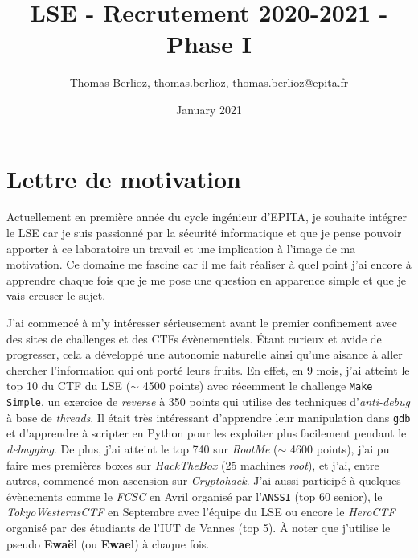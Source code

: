 \documentclass[a4paper, 11pt]{article}
\title{LSE - Recrutement 2020-2021 - Phase I}
\author{Thomas Berlioz, thomas.berlioz, thomas.berlioz@epita.fr}
\date{January 2021}
\begin{document}
\maketitle

\section*{Lettre de motivation}

    Actuellement en première année du cycle ingénieur d’EPITA, je souhaite intégrer le LSE car je suis passionné par la sécurité informatique et que je pense pouvoir apporter à ce laboratoire un travail et une implication à l’image de ma motivation. Ce domaine me fascine car il me fait réaliser à quel point j’ai encore à apprendre chaque fois que je me pose une question en apparence simple et que je vais creuser le sujet.

    J’ai commencé à m’y intéresser sérieusement avant le premier confinement avec des sites de challenges et des CTFs évènementiels. Étant curieux et avide de progresser, cela a développé une autonomie naturelle ainsi qu’une aisance à aller chercher l’information qui ont porté leurs fruits. En effet, en 9 mois, j’ai atteint le top 10 du CTF du LSE ($\sim$ 4500 points) avec récemment le challenge \texttt{Make Simple}, un exercice de \emph{reverse} à 350 points qui utilise des techniques d’\emph{anti-debug} à base de \emph{threads}. Il était très intéressant d'apprendre leur manipulation dans \texttt{gdb} et d'apprendre à scripter en Python pour les exploiter plus facilement pendant le \emph{debugging}. De plus, j’ai atteint le top 740 sur \emph{RootMe} ($\sim$ 4600 points), j’ai pu faire mes premières boxes sur \emph{HackTheBox} (25 machines \emph{root}), et j’ai, entre autres, commencé mon ascension sur \emph{Cryptohack}. J’ai aussi participé à quelques évènements comme le \emph{FCSC} en Avril organisé par l’\texttt{ANSSI} (top 60 senior), le \emph{TokyoWesternsCTF} en Septembre avec l’équipe du LSE ou encore le \emph{HeroCTF} organisé par des étudiants de l’IUT de Vannes (top 5). À noter que j’utilise le pseudo \textbf{Ewaël}  (ou \textbf{Ewael}) à chaque fois.
\end{document}
